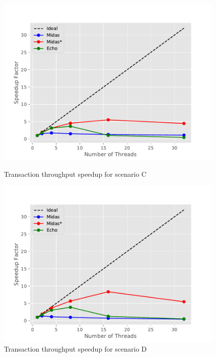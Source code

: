 \begin{figure}
\begin{minipage}[l]{0.50\textwidth}
        \includegraphics[width=\textwidth]{figures/bench/spd-ls}
        \caption{Transaction throughput speedup for scenario C}
\end{minipage}
\begin{minipage}[l]{0.50\textwidth}
        \includegraphics[width=\textwidth]{figures/bench/spd-ll}
        \caption{Transaction throughput speedup for scenario D}
\end{minipage}
\end{figure}

